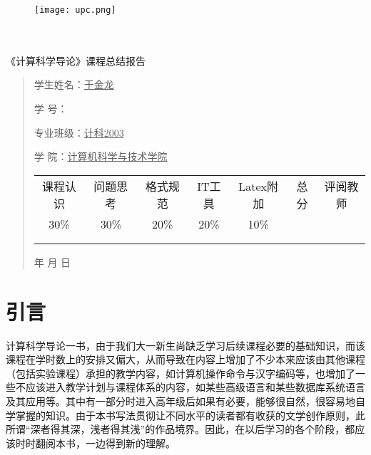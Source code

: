 \documentclass{article}
\renewcommand{\today}{\number\year 年 \number\month 月 \number\day 日}
\begin{document}
\begin{figure}
    \centering
    \texttt{[image: upc.png]}

    \label{figupc}
\end{figure}

	\begin{center}
		\quad \\
		\quad \\
		\heiti \fontsize{45}{17} \quad \quad \quad 
		\vskip 1.5cm
		\heiti {} 《计算科学导论》课程总结报告
	\end{center}
	\vskip 2.0cm
		
	\begin{quotation}
		\doublespacing
		
        \par\setlength\parindent{7em}
		\quad 

		学生姓名：\underline{\qquad  于金龙\qquad \qquad}

		学\hspace{0.61cm} 号：\underline{\qquad}
		
		专业班级：\underline{\qquad 计科2003 \qquad  }
		
        学\hspace{0.61cm} 院：\underline{计算机科学与技术学院}
		\vskip 2cm
		\centering
		\begin{table}[h]
            \centering 
            \begin{tabular}{|c|c|c|c|c|c|c|}
                \hline
                课程认识 & 问题思 考 & 格式规范  & IT工具  & Latex附加  & 总分 & 评阅教师 \\
                30\% & 30\% & 20\% & 20\% & 10\% &  &  \\
                \hline
                 & & & & & &\\
                & & & & & &\\
                \hline
            \end{tabular}
        \end{table}
		\vskip 2cm
		\today
	\end{quotation}

\thispagestyle{empty}
\newpage
\setcounter{page}{1}
\section{引言}
计算科学导论一书，由于我们大一新生尚缺乏学习后续课程必要的基础知识，而该课程在学时数上的安排又偏大，从而导致在内容上增加了不少本来应该由其他课程（包括实验课程）承担的教学内容，如计算机操作命令与汉字编码等，也增加了一些不应该进入教学计划与课程体系的内容，如某些高级语言和某些数据库系统语言及其应用等。其中有一部分时进入高年级后如果有必要，能够很自然，很容易地自学掌握的知识。由于本书写法贯彻让不同水平的读者都有收获的文学创作原则，此所谓“深者得其深，浅者得其浅”的作品境界。因此，在以后学习的各个阶段，都应该时时翻阅本书，一边得到新的理解。
\end{document}
